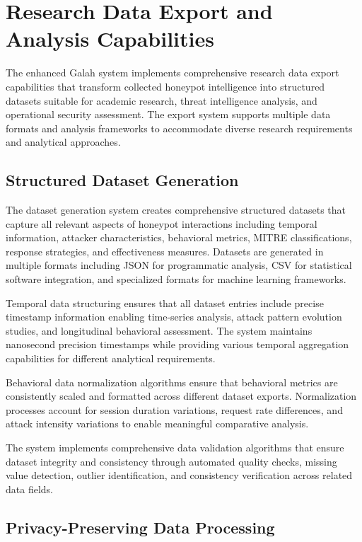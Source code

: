 \section{Research Data Export and Analysis Capabilities}

The enhanced Galah system implements comprehensive research data export capabilities that transform collected honeypot intelligence into structured datasets suitable for academic research, threat intelligence analysis, and operational security assessment. The export system supports multiple data formats and analysis frameworks to accommodate diverse research requirements and analytical approaches.

\subsection{Structured Dataset Generation}

The dataset generation system creates comprehensive structured datasets that capture all relevant aspects of honeypot interactions including temporal information, attacker characteristics, behavioral metrics, MITRE classifications, response strategies, and effectiveness measures. Datasets are generated in multiple formats including JSON for programmatic analysis, CSV for statistical software integration, and specialized formats for machine learning frameworks.

Temporal data structuring ensures that all dataset entries include precise timestamp information enabling time-series analysis, attack pattern evolution studies, and longitudinal behavioral assessment. The system maintains nanosecond precision timestamps while providing various temporal aggregation capabilities for different analytical requirements.

Behavioral data normalization algorithms ensure that behavioral metrics are consistently scaled and formatted across different dataset exports. Normalization processes account for session duration variations, request rate differences, and attack intensity variations to enable meaningful comparative analysis.

The system implements comprehensive data validation algorithms that ensure dataset integrity and consistency through automated quality checks, missing value detection, outlier identification, and consistency verification across related data fields.

\subsection{Privacy-Preserving Data Processing}

